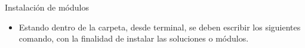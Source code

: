 \begin{frame}{Instalaci\'on de m\'odulos}
\begin{itemize}
\item Estando dentro de la carpeta, desde terminal, se deben escribir los siguientes comando, con la finalidad de instalar las soluciones o m\'odulos.


\end{itemize}
\end{frame}
